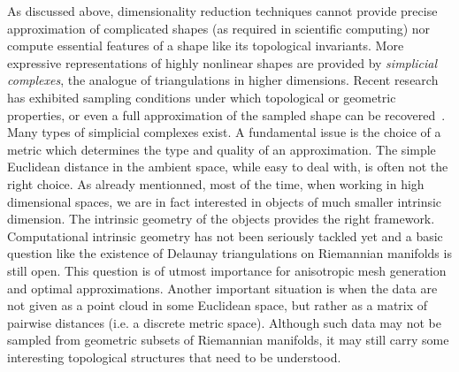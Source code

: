 
As discussed above, dimensionality reduction techniques cannot provide precise approximation of complicated shapes (as required in scientific computing) nor compute essential features of a shape like its topological invariants.
More expressive representations of  highly nonlinear shapes are provided %
by {\em simplicial complexes}, the analogue of triangulations in higher dimensions. Recent research has exhibited sampling conditions under which  topological or geometric properties, or even a full approximation of the sampled shape can be recovered~\cite{geometrica-7142i,geometrica-ccl09,nsw-fhm-2008}. 
Many types of simplicial complexes exist. 
A fundamental issue is the choice of a metric which determines the type and quality of an approximation.
 The simple Euclidean distance in the ambient space, while easy to deal with, is often not the right choice.  As already mentionned, most of the time, when working in high dimensional spaces, we are in fact interested in objects of much smaller intrinsic dimension. The intrinsic geometry of the objects provides the right framework. Computational intrinsic geometry has not been seriously tackled yet and a basic question like the existence of  Delaunay triangulations on Riemannian manifolds is still open.  This question is of utmost importance for anisotropic mesh generation and optimal approximations. Another important situation is when the data are not given as a point cloud in some Euclidean space, but rather as a matrix of pairwise distances (i.e. a discrete metric space). Although such data may not be sampled from geometric subsets of Riemannian manifolds, it may still carry some interesting topological structures that need to be understood. 

